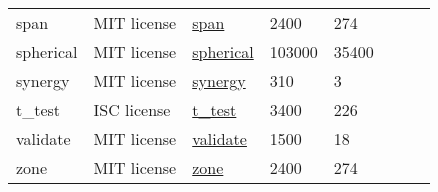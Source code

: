 \begin{table}[t]
{\begin{tabular}{llllllll}
span &MIT license &\href{https://github.com/drawcall/Proton/blob/master/src/math/Span.js}{span} &2400 &274 \\
spherical &MIT license &\href{https://github.com/mrdoob/three.js/blob/dev/src/math/Spherical.js}{spherical} &103000 &35400 \\
synergy &MIT license &\href{https://github.com/defx/synergy/tree/master/src}{synergy} &310 &3 \\
t\_test &ISC license &\href{https://github.com/simple-statistics/simple-statistics/blob/main/src/t_test.js}{t\_test} &3400 &226 \\
validate &MIT license &\href{https://github.com/ehmicky/modern-errors/blob/main/src/subclass/validate.js}{validate} &1500 &18 \\
zone &MIT license &\href{https://github.com/drawcall/Proton/blob/master/src/zone/Zone.js}{zone} &2400 &274 \\
\hline
\end{tabular}
}
\label{tab: individual_dataset_js}
\end{table}